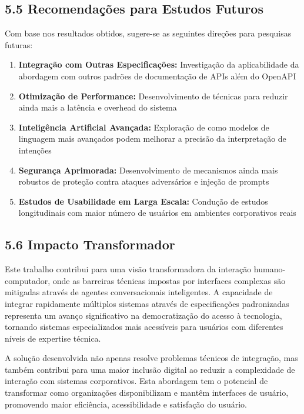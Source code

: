 \documentclass[
]{article}
\providecommand{\tightlist}{%
  \setlength{\itemsep}{0pt}\setlength{\parskip}{0pt}}
\begin{document}
\subsection{5.5 Recomendações para Estudos
Futuros}\label{recomendauxe7uxf5es-para-estudos-futuros}

Com base nos resultados obtidos, sugere-se as seguintes direções para
pesquisas futuras:

\begin{enumerate}
\def\labelenumi{\arabic{enumi}.}
\tightlist
\item
  \textbf{Integração com Outras Especificações:} Investigação da
  aplicabilidade da abordagem com outros padrões de documentação de APIs
  além do OpenAPI
\item
  \textbf{Otimização de Performance:} Desenvolvimento de técnicas para
  reduzir ainda mais a latência e overhead do sistema
\item
  \textbf{Inteligência Artificial Avançada:} Exploração de como modelos
  de linguagem mais avançados podem melhorar a precisão da interpretação
  de intenções
\item
  \textbf{Segurança Aprimorada:} Desenvolvimento de mecanismos ainda
  mais robustos de proteção contra ataques adversários e injeção de
  prompts
\item
  \textbf{Estudos de Usabilidade em Larga Escala:} Condução de estudos
  longitudinais com maior número de usuários em ambientes corporativos
  reais
\end{enumerate}

\subsection{5.6 Impacto Transformador}\label{impacto-transformador}

Este trabalho contribui para uma visão transformadora da interação
humano-computador, onde as barreiras técnicas impostas por interfaces
complexas são mitigadas através de agentes conversacionais inteligentes.
A capacidade de integrar rapidamente múltiplos sistemas através de
especificações padronizadas representa um avanço significativo na
democratização do acesso à tecnologia, tornando sistemas especializados
mais acessíveis para usuários com diferentes níveis de expertise
técnica.

A solução desenvolvida não apenas resolve problemas técnicos de
integração, mas também contribui para uma maior inclusão digital ao
reduzir a complexidade de interação com sistemas corporativos. Esta
abordagem tem o potencial de transformar como organizações
disponibilizam e mantêm interfaces de usuário, promovendo maior
eficiência, acessibilidade e satisfação do usuário.
\end{document}
